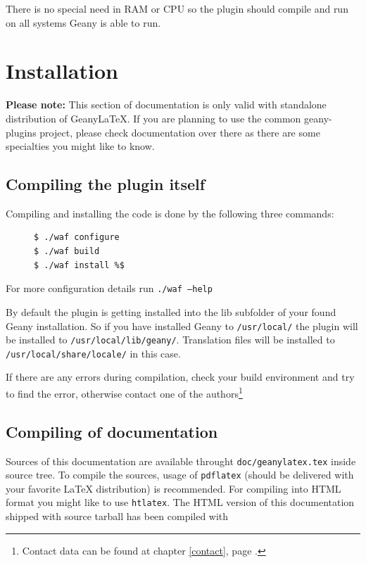 \documentclass[%
a4paper,%
10pt,%
oneside,%
DIV18,
headsepline,
plainheadsepline,
footsepline,
plainfootsepline,
bibtotoc,%
liststotoc,%
BCOR12mm,%
halfparskip,%
openany,%
]{scrartcl}
\begin{document}
There is no special need in RAM or CPU so the plugin should compile and
run on all systems Geany is able to run.

\section{Installation}

\small{\textbf{Please note:} This section of documentation is only valid with standalone distribution of Geany\LaTeX{}. If you are planning to use the common geany-plugins project, please check documentation over there as there are some specialties you might like to know.}

\subsection{Compiling the plugin itself}
Compiling and installing the code is done by the following three
commands:

\begin{figure}[h!]
\begin{lstlisting}
$ ./waf configure
$ ./waf build
$ ./waf install %$
\end{lstlisting}
\end{figure}

For more configuration details run \texttt{./waf --help}

By default the plugin is getting installed into the lib subfolder of
your found Geany installation. So if you have installed Geany to
\texttt{/usr/local/} the plugin will be installed to
\texttt{/usr/local/lib/geany/}. Translation files will be installed to
\texttt{/usr/local/share/locale/} in this case.

If there are any errors during compilation, check your build environment
and try to find the error, otherwise contact one of the
authors\footnote{Contact data can be found at chapter \ref{contact},
page \pageref{contact}.}

\subsection{Compiling of documentation}
\label{sec:compiling_of_documentation}
Sources of this documentation are available throught
\texttt{doc/geanylatex.tex} inside source tree. To compile the sources,
usage of \texttt{pdflatex} (should be delivered with your favorite
\LaTeX{} distribution) is recommended. For compiling into HTML format you
might like to use \texttt{htlatex}. The HTML version of this documentation
shipped with source tarball has been compiled with
\end{document}
